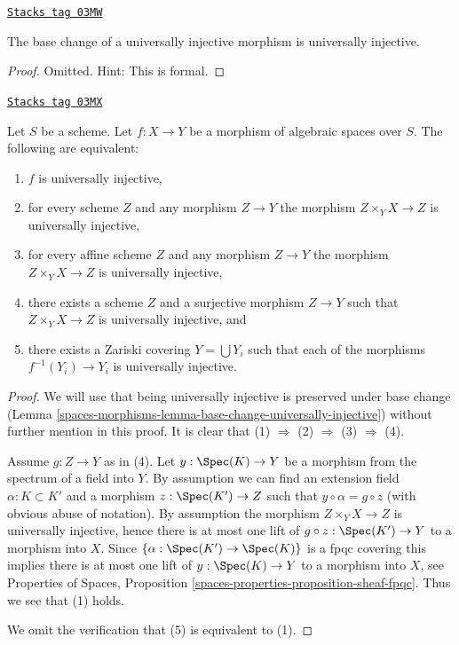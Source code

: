 \begin{lemma}
\label{spaces-morphisms-lemma-base-change-universally-injective}
\href{https://stacks.math.columbia.edu/tag/03MW}{\texttt{Stacks tag 03MW}}

The base change of a universally injective morphism is universally injective.
\end{lemma}

\begin{proof}
Omitted. Hint: This is formal.
\end{proof}

\begin{lemma}
\label{spaces-morphisms-lemma-universally-injective-local}
\href{https://stacks.math.columbia.edu/tag/03MX}{\texttt{Stacks tag 03MX}}

Let $S$ be a scheme.
Let $f : X \to Y$ be a morphism of algebraic spaces over $S$.
The following are equivalent:
\begin{enumerate}
\item $f$ is universally injective,
\item for every scheme $Z$ and any morphism $Z \to Y$ the morphism
$Z \times_Y X \to Z$ is universally injective,
\item for every affine scheme $Z$ and any morphism
$Z \to Y$ the morphism $Z \times_Y X \to Z$ is universally injective,
\item there exists a scheme $Z$ and a surjective morphism
$Z \to Y$ such that $Z \times_Y X \to Z$ is universally injective, and
\item there exists a Zariski covering $Y = \bigcup Y_i$ such that
each of the morphisms $f^{-1}(Y_i) \to Y_i$ is universally injective.
\end{enumerate}
\end{lemma}

\begin{proof}
We will use that being universally injective is preserved under base change
(Lemma \ref{spaces-morphisms-lemma-base-change-universally-injective})
without further mention in this proof.
It is clear that (1) $\Rightarrow$ (2) $\Rightarrow$ (3)
$\Rightarrow$ (4).

\medskip\noindent
Assume $g : Z \to Y$ as in (4). Let $y : \Spec(K) \to Y$ be a
morphism from the spectrum of a field into $Y$. By assumption we
can find an extension field $\alpha : K \subset K'$ and a morphism
$z : \Spec(K') \to Z$ such that $y \circ \alpha = g \circ z$
(with obvious abuse of notation). By assumption the
morphism $Z \times_Y X \to Z$ is universally injective, hence there
is at most one
lift of $g \circ z : \Spec(K') \to Y$ to a morphism into $X$.
Since $\{\alpha : \Spec(K') \to \Spec(K)\}$ is a
fpqc covering this implies there is at most one lift of
$y : \Spec(K) \to Y$ to a morphism into $X$, see
Properties of Spaces, Proposition
\ref{spaces-properties-proposition-sheaf-fpqc}.
Thus we see that (1) holds.

\medskip\noindent
We omit the verification that (5) is equivalent to (1).
\end{proof}

